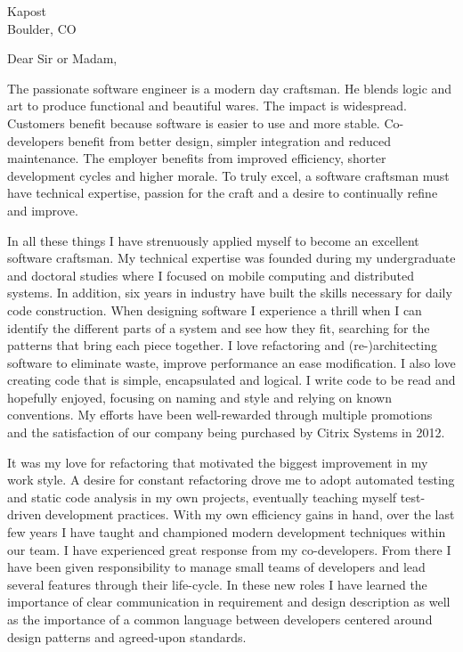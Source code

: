 \documentclass{letter}
\date{}
\begin{document}
\address{Nathanael Thompson\\1102 Lincolnshire Drive\\Champaign, IL 61821\\nat@alumni.brown.edu\\(469)
230-7125 (mobile)}
\signature{Nathanael Thompson}
\begin{letter}{Kapost\\Boulder, CO}

\opening{Dear Sir or Madam,}
The passionate software engineer is a modern day craftsman.  He
blends logic and art to produce functional and beautiful wares.
The impact is widespread.  Customers benefit because software is
easier to use and more stable.  Co-developers benefit from better
design, simpler integration and reduced maintenance.  The employer
benefits from improved efficiency, shorter development cycles and
higher morale.  To truly excel, a software craftsman must have
technical expertise, passion for the craft and a desire to continually
refine and improve.

In all these things I have strenuously applied myself to become an
excellent software craftsman.  My technical expertise was founded
during my undergraduate and doctoral studies where I focused on
mobile computing and distributed systems.  In addition, six years
in industry have built the skills necessary for daily code construction.
When designing software I experience a thrill when I can identify
the different parts of a system and see how they fit, searching for
the patterns that bring each piece together.  I love refactoring
and (re-)architecting software to eliminate waste, improve performance
an ease modification.  I also love creating code that is simple,
encapsulated and logical.  I write code to be read and hopefully
enjoyed, focusing on naming and style and relying on known conventions.
My efforts have been well-rewarded through multiple promotions and
the satisfaction of our company being purchased by Citrix Systems
in 2012.

It was my love for refactoring that motivated the biggest improvement
in my work style.  A desire for constant refactoring drove me to
adopt automated testing and static code analysis in my own projects,
eventually teaching myself test-driven development practices.  With
my own efficiency gains in hand, over the last few years I have
taught and championed modern development techniques within our team.
I have experienced great response from my co-developers.  From there
I have been given responsibility to manage small teams of developers
and lead several features through their life-cycle.  In these new
roles I have learned the importance of clear communication in
requirement and design description as well as the importance of a
common language between developers centered around design patterns
and agreed-upon standards.


\end{letter}
\end{document}
